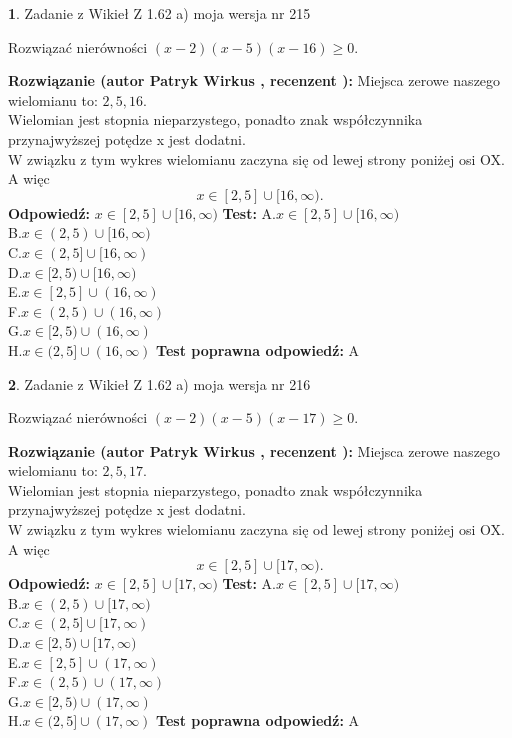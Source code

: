 \documentclass[12pt, a4paper]{article}
\theoremstyle{definition} %
\newtheorem{zad}{}
\newcommand{\zadStart}[1]{\begin{zad}#1\newline}
\newcommand{\zadStop}{\end{zad}}
\newcommand{\rozwStart}[2]{\noindent \textbf{Rozwiązanie (autor #1 , recenzent #2): }\newline}
\newcommand{\rozwStop}{\newline}
\newcommand{\odpStart}{\noindent \textbf{Odpowiedź:}\newline}
\newcommand{\odpStop}{\newline}
\newcommand{\testStart}{\noindent \textbf{Test:}\newline}
\newcommand{\testStop}{\newline}
\newcommand{\kluczStart}{\noindent \textbf{Test poprawna odpowiedź:}\newline}
\newcommand{\kluczStop}{\newline}
\begin{document}
\zadStart{Zadanie z Wikieł Z 1.62 a) moja wersja nr 215}

Rozwiązać nierówności $(x-2)(x-5)(x-16)\ge0$.
\zadStop
\rozwStart{Patryk Wirkus}{}
Miejsca zerowe naszego wielomianu to: $2, 5, 16$.\\
Wielomian jest stopnia nieparzystego, ponadto znak współczynnika przy\linebreak najwyższej potędze x jest dodatni.\\ W związku z tym wykres wielomianu zaczyna się od lewej strony poniżej osi OX. A więc $$x \in [2,5] \cup [16,\infty).$$
\rozwStop
\odpStart
$x \in [2,5] \cup [16,\infty)$
\odpStop
\testStart
A.$x \in [2,5] \cup [16,\infty)$\\
B.$x \in (2,5) \cup [16,\infty)$\\
C.$x \in (2,5] \cup [16,\infty)$\\
D.$x \in [2,5) \cup [16,\infty)$\\
E.$x \in [2,5] \cup (16,\infty)$\\
F.$x \in (2,5) \cup (16,\infty)$\\
G.$x \in [2,5) \cup (16,\infty)$\\
H.$x \in (2,5] \cup (16,\infty)$
\testStop
\kluczStart
A
\kluczStop



\zadStart{Zadanie z Wikieł Z 1.62 a) moja wersja nr 216}

Rozwiązać nierówności $(x-2)(x-5)(x-17)\ge0$.
\zadStop
\rozwStart{Patryk Wirkus}{}
Miejsca zerowe naszego wielomianu to: $2, 5, 17$.\\
Wielomian jest stopnia nieparzystego, ponadto znak współczynnika przy\linebreak najwyższej potędze x jest dodatni.\\ W związku z tym wykres wielomianu zaczyna się od lewej strony poniżej osi OX. A więc $$x \in [2,5] \cup [17,\infty).$$
\rozwStop
\odpStart
$x \in [2,5] \cup [17,\infty)$
\odpStop
\testStart
A.$x \in [2,5] \cup [17,\infty)$\\
B.$x \in (2,5) \cup [17,\infty)$\\
C.$x \in (2,5] \cup [17,\infty)$\\
D.$x \in [2,5) \cup [17,\infty)$\\
E.$x \in [2,5] \cup (17,\infty)$\\
F.$x \in (2,5) \cup (17,\infty)$\\
G.$x \in [2,5) \cup (17,\infty)$\\
H.$x \in (2,5] \cup (17,\infty)$
\testStop
\kluczStart
A
\kluczStop
\end{document}
